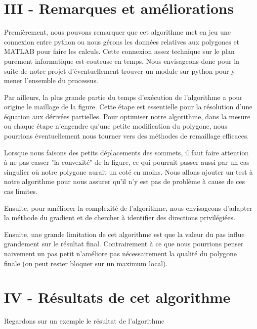 \documentclass[a4paper,reqno]{article}
\begin{document}
\section*{III - Remarques et améliorations}
Premièrement, nous pouvons remarquer que cet algorithme met en jeu une connexion entre python ou nous gérons les données relatives aux polygones et MATLAB pour faire les calculs. Cette connexion assez technique sur le plan purement informatique est couteuse en temps. Nous envisageons donc pour la suite de notre projet d'éventuellement trouver un module sur python pour y mener l'ensemble du processus. \par
Par ailleurs, la plus grande partie du temps d'exécution de l'algorithme a pour origine le maillage de la figure. Cette étape est essentielle pour la résolution d'une équation aux dérivées partielles. Pour optimiser notre algorithme, dans la mesure ou chaque étape n'engendre qu'une petite modification du polygone, nous pourrions éventuellement nous tourner vers des méthodes de remaillage efficaces. \par
Lorsque nous faisons des petits déplacements des sommets, il faut faire attention à ne pas casser "la convexité" de la figure, ce qui pourrait passer aussi par un cas singulier où notre polygone aurait un coté en moins. Nous allons ajouter un test à notre algorithme pour nous assurer qu'il n'y est pas de problème à cause de ces cas limites. \par
Ensuite, pour améliorer la complexité de l'algorithme, nous envisageons d'adapter la méthode du gradient et de chercher à identifier des directions privilégiées.\par
Ensuite, une grande limitation de cet algorithme est que la valeur du pas influe grandement sur le résultat final. Contrairement à ce que nous pourrions penser naivement un pas petit n'améliore pas nécessairement la qualité du polygone finale (on peut rester bloquer sur un maximum local).

\newpage
\section*{IV - Résultats de cet algorithme }
Regardons sur un exemple le résultat de l'algorithme
\end{document}
